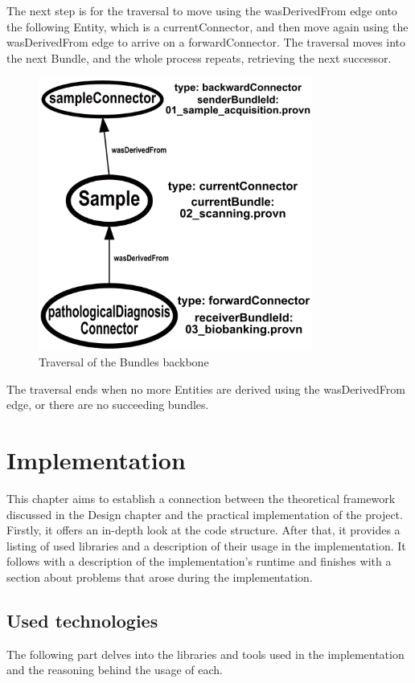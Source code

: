 \documentclass[
  digital,     %
  oneside,     %
  nosansbold,  %
  nocolorbold, %
  lof,         %
  lot,         %
]{fithesis4}
\begin{document}
The next step is for the traversal to move using the wasDerivedFrom edge onto the following Entity, which is a currentConnector, and then move again using the wasDerivedFrom edge to arrive on a forwardConnector. The traversal moves into the next Bundle, and the whole process repeats, retrieving the next successor.

\begin{figure}[htbp]
  \begin{center}
    \includegraphics[width=9cm]{fithesis/images/examplebigger.png}
  \end{center}
  \caption{Traversal of the Bundles backbone}
  \label{fig:bundleexample4}
\end{figure}

The traversal ends when no more Entities are derived using the wasDerivedFrom edge, or there are no succeeding bundles.


\chapter{Implementation}
\shorthandoff{-}
This chapter aims to establish a connection between the theoretical framework discussed in the Design chapter and the practical implementation of the project. Firstly, it offers an in-depth look at the code structure. After that, it provides a listing of used libraries and a description of their usage in the implementation. It follows with a description of the implementation's runtime and finishes with a section about problems that arose during the implementation.

\section{Used technologies}
The following part delves into the libraries and tools used in the implementation and the reasoning behind the usage of each.
\end{document}
